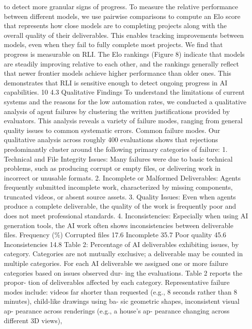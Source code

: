 to detect more granular signs of progress. To measure the relative performance between different
models, we use pairwise comparisons to compute an Elo score that represents how close models
are to completing projects along with the overall quality of their deliverables. This enables tracking
improvements between models, even when they fail to fully complete most projects.
We find that progress is measurable on RLI. The Elo rankings (Figure 8) indicate that models are
steadily improving relative to each other, and the rankings generally reflect that newer frontier models
achieve higher performance than older ones. This demonstrates that RLI is sensitive enough to detect
ongoing progress in AI capabilities.
10
4.3
Qualitative Findings
To understand the limitations of current systems and the reasons for the low automation rates, we
conducted a qualitative analysis of agent failures by clustering the written justifications provided by
evaluators. This analysis reveals a variety of failure modes, ranging from general quality issues to
common systematic errors.
Common failure modes.
Our qualitative analysis across roughly 400 evaluations shows that
rejections predominantly cluster around the following primary categories of failure:
1. Technical and File Integrity Issues: Many failures were due to basic technical problems,
such as producing corrupt or empty files, or delivering work in incorrect or unusable formats.
2. Incomplete or Malformed Deliverables: Agents frequently submitted incomplete work,
characterized by missing components, truncated videos, or absent source assets.
3. Quality Issues: Even when agents produce a complete deliverable, the quality of the work
is frequently poor and does not meet professional standards.
4. Inconsistencies: Especially when using AI generation tools, the AI work often shows
inconsistencies between deliverable files.
Frequency (\%)
Corrupted files
17.6
Incomplete
35.7
Poor quality
45.6
Inconsistencies
14.8
Table 2: Percentage of AI deliverables exhibiting
issues, by category. Categories are not mutually
exclusive; a deliverable may be counted in multiple
categories.
For each AI deliverable we assigned one or more
failure categories based on issues observed dur-
ing the evaluations. Table 2 reports the propor-
tion of deliverables affected by each category.
Representative failure modes include: videos
far shorter than requested (e.g., 8 seconds rather
than 8 minutes), child-like drawings using ba-
sic geometric shapes, inconsistent visual ap-
pearance across renderings (e.g., a house’s ap-
pearance changing across different 3D views),

